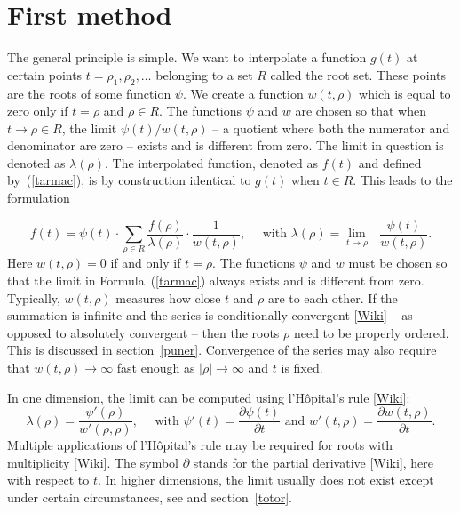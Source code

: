 \documentclass[oneside,10pt]{book}
\begin{document}
\section{First method}

The general principle is simple. We want to interpolate a function $g(t)$ at certain points $t = \rho_1, \rho_2,\dots$ belonging to a set $R$ called the root set. These points  are the roots of some function $\psi$. We create a function $w(t,\rho)$ which is equal to zero only if $t=\rho$ and $\rho\in R$. The functions $\psi$ and $w$ are chosen so that when $t\rightarrow \rho\in R$, the limit
$\psi(t)/w(t,\rho)$ -- a quotient where both the numerator and denominator are zero -- exists and is different from zero. The limit in question is denoted as $\lambda(\rho)$. The interpolated function, denoted as $f(t)$ and defined by~(\ref{tarmac}), is by construction  identical to $g(t)$ when $t\in R$.  This leads to the formulation

\begin{equation}
f(t)=\psi(t)\cdot \sum_{\rho\in R} \frac{f(\rho)}{\lambda(\rho)}\cdot \frac{1}{w(t,\rho)}, \quad \text{ with } \lambda(\rho) =   \lim_{t\rightarrow \rho} \text{ } \frac{\psi(t)}{w(t,\rho)}.\label{tarmac}
\end{equation}
Here $w(t,\rho) = 0$ if and only if $t=\rho$. The functions $\psi$ and $w$ must be chosen so that the limit in
 Formula~(\ref{tarmac}) always exists and is different from zero. Typically, $w(t,\rho)$ measures how close $t$ and $\rho$ are to each other. If the summation is infinite and the series is 
\textcolor{index}{conditionally convergent} [\href{https://en.wikipedia.org/wiki/Conditional_convergence}{Wiki}] -- as opposed to \textcolor{index}{absolutely convergent} -- then the roots $\rho$ need to be properly ordered. This is discussed in section~\ref{puner}. Convergence of the series may also require that 
 $w(t,\rho) \rightarrow \infty$ fast enough as $|\rho|\rightarrow\infty$ and $t$ is fixed.

In one dimension, the limit can be computed using l'Hôpital's rule [\href{https://en.wikipedia.org/wiki/L\%27H\%C3\%B4pital\%27s_rule}{Wiki}]:   
$$\lambda(\rho) = \frac{\psi'(\rho)}{w'(\rho,\rho)}, \quad \text{ with } \psi'(t)=\frac{\partial \psi(t)}{\partial t} \text{ and } 
w'(t,\rho) = \frac{\partial w(t,\rho)}{\partial t}.$$
Multiple applications of l'Hôpital's rule may be required for \textcolor{index}{roots with multiplicity} [\href{https://en.wikipedia.org/wiki/Multiplicity_(mathematics)}{Wiki}]. 
The symbol $\partial$ stands for the 
 \textcolor{index}{partial derivative} [\href{https://en.wikipedia.org/wiki/Partial_derivative}{Wiki}], here with respect to $t$. In higher dimensions, the limit usually does not exist except under certain circumstances, see \cite{13rob} and
 section~\ref{totor}. 
\end{document}
